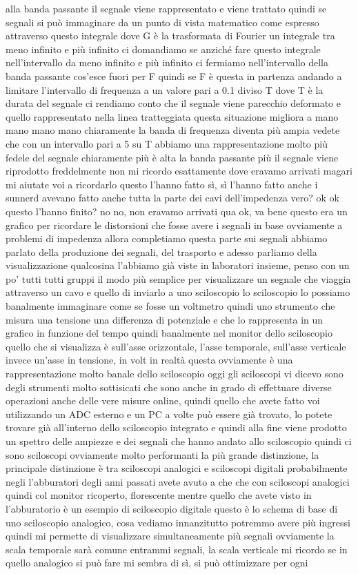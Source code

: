 alla banda passante il segnale viene rappresentato e viene trattato quindi se segnali si può immaginare da un punto di vista matematico come espresso attraverso questo integrale dove G è la trasformata di Fourier un integrale tra meno infinito e più infinito ci domandiamo se anziché fare questo integrale nell'intervallo da meno infinito e più infinito ci fermiamo nell'intervallo della banda passante cos'esce fuori per F quindi se F è questa in partenza andando a limitare l'intervallo di frequenza a un valore pari a 0.1 diviso T dove T è la durata del segnale ci rendiamo conto che il segnale viene parecchio deformato e quello rappresentato nella linea tratteggiata questa situazione migliora a mano mano mano mano chiaramente la banda di frequenza diventa più ampia vedete che con un intervallo pari a 5 su T abbiamo una rappresentazione molto più fedele del segnale chiaramente più è alta la banda passante più il segnale viene riprodotto freddelmente non mi ricordo esattamente dove eravamo arrivati magari mi aiutate voi a ricordarlo questo l'hanno fatto sì, sì l'hanno fatto anche i sunnerd avevano fatto anche tutta la parte dei cavi dell'impedenza vero? ok ok questo l'hanno finito? no no, non eravamo arrivati qua ok, va bene questo era un grafico per ricordare le distorsioni che fosse avere i segnali in base ovviamente a problemi di impedenza allora completiamo questa parte sui segnali abbiamo parlato della produzione dei segnali, del trasporto e adesso parliamo della visualizzazione qualcosina l'abbiamo già viste in laboratori insieme, penso con un po' tutti tutti gruppi il modo più semplice per visualizzare un segnale che viaggia attraverso un cavo e quello di inviarlo a uno sciloscopio lo sciloscopio lo possiamo banalmente immaginare come se fosse un voltmetro quindi uno strumento che misura una tensione una differenza di potenziale e che lo rappresenta in un grafico in funzione del tempo quindi banalmente nel monitor dello sciloscopio quello che si visualizza è sull'asse orizzontale, l'asse temporale, sull'asse verticale invece un'asse in tensione, in volt in realtà questa ovviamente è una rappresentazione molto banale dello sciloscopio oggi gli sciloscopi vi dicevo sono degli strumenti molto sottisicati che sono anche in grado di effettuare diverse operazioni anche delle vere misure online, quindi quello che avete fatto voi utilizzando un ADC esterno e un PC a volte può essere già trovato, lo potete trovare già all'interno dello sciloscopio integrato e quindi alla fine viene prodotto un spettro delle ampiezze e dei segnali che hanno andato allo sciloscopio quindi ci sono sciloscopi ovviamente molto performanti la più grande distinzione, la principale distinzione è tra sciloscopi analogici e sciloscopi digitali probabilmente negli l'abburatori degli anni passati avete avuto a che che con sciloscopi analogici quindi col monitor ricoperto, florescente mentre quello che avete visto in l'abburatorio è un esempio di sciloscopio digitale questo è lo schema di base di uno sciloscopio analogico, cosa vediamo innanzitutto potremmo avere più ingressi quindi mi permette di visualizzare simultaneamente più segnali ovviamente la scala temporale sarà comune entrammi segnali, la scala verticale mi ricordo se in quello analogico si può fare mi sembra di sì, si può ottimizzare per ogni 